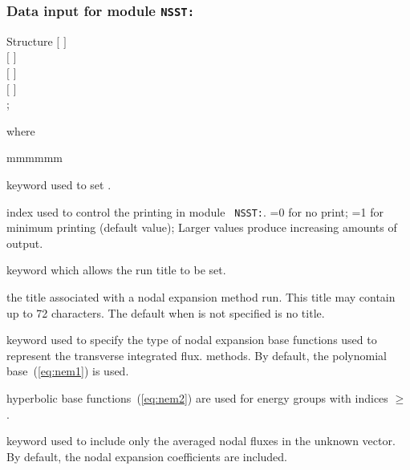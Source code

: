 \clearpage

\subsubsection{Data input for module {\tt NSST:}}\label{sect:NSST_data}

\begin{DataStructure}{Structure }
$[$   $]$ \\
$[$   $]$ \\
$[$   $]$ \\
$[$  $]$ \\
;
\end{DataStructure}

\noindent where
\begin{ListeDeDescription}{mmmmmm}

\item[\moc{EDIT}] keyword used to set .

\item[\dusa{iprint}] index used to control the printing  in module {\tt
NSST:}. =0 for no print; =1 for minimum printing (default value); Larger
values produce increasing amounts of output.

\item[\moc{TITL}] keyword which allows the run title to be set.

\item[\dusa{TITLE}] the title associated with a nodal expansion method run. This
title may contain up to 72 characters. The default when  is not specified is no title.

\item[\moc{HYPE}] keyword used to specify the type of nodal expansion base functions used to represent the transverse integrated flux.
methods. By default, the polynomial base~(\ref{eq:nem1}) is used.

\item[\dusa{igmax}] hyperbolic base functions~(\ref{eq:nem2}) are used for energy groups with indices $\ge$ .

\item[\moc{LUMP}] keyword used to include only the averaged nodal fluxes in the unknown vector. By default, the nodal expansion coefficients are included.

\end{ListeDeDescription}

\clearpage

